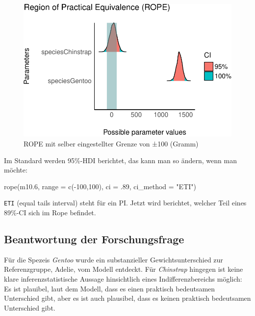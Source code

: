 \documentclass[
  a4paper,
  DIV=11]{scrreprt}
\newenvironment{Shaded}{\begin{snugshade}}{\end{snugshade}}
\newcommand{\AttributeTok}[1]{\textcolor[rgb]{0.40,0.45,0.13}{#1}}
\newcommand{\DecValTok}[1]{\textcolor[rgb]{0.68,0.00,0.00}{#1}}
\newcommand{\FloatTok}[1]{\textcolor[rgb]{0.68,0.00,0.00}{#1}}
\newcommand{\FunctionTok}[1]{\textcolor[rgb]{0.28,0.35,0.67}{#1}}
\newcommand{\NormalTok}[1]{\textcolor[rgb]{0.00,0.23,0.31}{#1}}
\newcommand{\SpecialCharTok}[1]{\textcolor[rgb]{0.37,0.37,0.37}{#1}}
\newcommand{\StringTok}[1]{\textcolor[rgb]{0.13,0.47,0.30}{#1}}
\theoremstyle{definition}
\theoremstyle{remark}
\begin{document}
\begin{figure}[H]

{\centering \includegraphics{./metrische-AV_files/figure-pdf/fig-rope-range-1.pdf}

}

\caption{\label{fig-rope-range}ROPE mit selber eingestellter Grenze von
±100 (Gramm)}

\end{figure}

Im Standard werden 95\%-HDI berichtet, das kann man so ändern, wenn man
möchte:

\begin{Shaded}
\begin{Highlighting}[]
\FunctionTok{rope}\NormalTok{(m10}\FloatTok{.6}\NormalTok{, }\AttributeTok{range =} \FunctionTok{c}\NormalTok{(}\SpecialCharTok{{-}}\DecValTok{100}\NormalTok{,}\DecValTok{100}\NormalTok{), }\AttributeTok{ci =}\NormalTok{ .}\DecValTok{89}\NormalTok{, }\AttributeTok{ci\_method =} \StringTok{"ETI"}\NormalTok{)}
\end{Highlighting}
\end{Shaded}

\texttt{ETI} (equal tails interval) steht für ein PI. Jetzt wird
berichtet, welcher Teil eines 89\%-CI sich im Rope befindet.

\hypertarget{beantwortung-der-forschungsfrage}{%
\subsection{Beantwortung der
Forschungsfrage}\label{beantwortung-der-forschungsfrage}}

Für die Spezeis \emph{Gentoo} wurde ein substanzieller
Gewichtsunterschied zur Referenzgruppe, Adelie, vom Modell entdeckt. Für
\emph{Chinstrap} hingegen ist keine klare inferenzstatistische Aussage
hinsichtlich eines Indifferenzbereichs möglich: Es ist plauibel, laut
dem Modell, dass es einen praktisch bedeutsamen Unterschied gibt, aber
es ist auch plausibel, dass es keinen praktisch bedeutsamen Unterschied
gibt.
\end{document}
